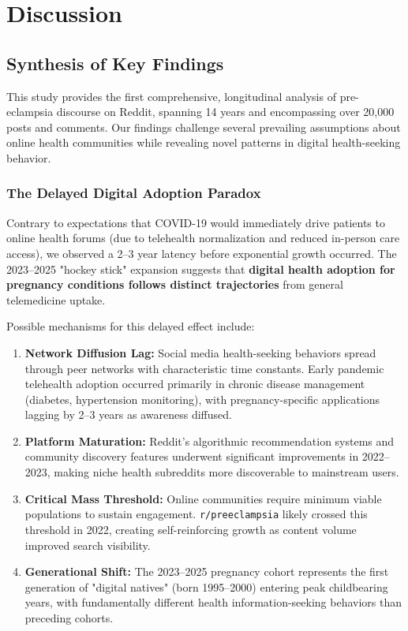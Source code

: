 \documentclass[12pt, a4paper]{article}
\begin{document}
\section{Discussion}

\subsection{Synthesis of Key Findings}
This study provides the first comprehensive, longitudinal analysis of pre-eclampsia discourse on Reddit, spanning 14 years and encompassing over 20,000 posts and comments. Our findings challenge several prevailing assumptions about online health communities while revealing novel patterns in digital health-seeking behavior.

\subsubsection{The Delayed Digital Adoption Paradox}
Contrary to expectations that COVID-19 would immediately drive patients to online health forums (due to telehealth normalization and reduced in-person care access), we observed a 2--3 year latency before exponential growth occurred. The 2023--2025 "hockey stick" expansion suggests that \textbf{digital health adoption for pregnancy conditions follows distinct trajectories} from general telemedicine uptake.

Possible mechanisms for this delayed effect include:
\begin{enumerate}
    \item \textbf{Network Diffusion Lag:} Social media health-seeking behaviors spread through peer networks with characteristic time constants. Early pandemic telehealth adoption occurred primarily in chronic disease management (diabetes, hypertension monitoring), with pregnancy-specific applications lagging by 2--3 years as awareness diffused.
    
    \item \textbf{Platform Maturation:} Reddit's algorithmic recommendation systems and community discovery features underwent significant improvements in 2022--2023, making niche health subreddits more discoverable to mainstream users.
    
    \item \textbf{Critical Mass Threshold:} Online communities require minimum viable populations to sustain engagement. \texttt{r/preeclampsia} likely crossed this threshold in 2022, creating self-reinforcing growth as content volume improved search visibility.
    
    \item \textbf{Generational Shift:} The 2023--2025 pregnancy cohort represents the first generation of "digital natives" (born 1995--2000) entering peak childbearing years, with fundamentally different health information-seeking behaviors than preceding cohorts.
\end{enumerate}
\end{document}
